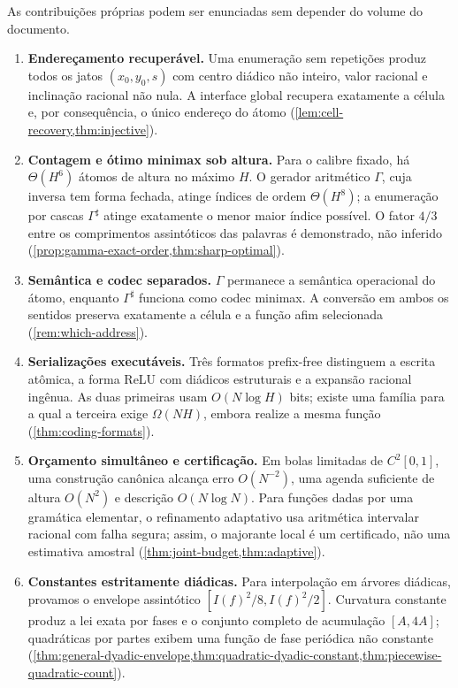 As contribuições próprias podem ser enunciadas sem depender do volume do
documento.

\begin{enumerate}[label=(\roman*),leftmargin=*]
 \item \textbf{Endereçamento recuperável.} Uma enumeração sem repetições
 produz todos os jatos $(x_0,y_0,s)$ com centro diádico não inteiro, valor
 racional e inclinação racional não nula. A interface global recupera
 exatamente a célula e, por consequência, o único endereço do átomo
 (\cref{lem:cell-recovery,thm:injective}).

 \item \textbf{Contagem e ótimo minimax sob altura.} Para o calibre fixado,
 há $\Theta(H^6)$ átomos de altura no máximo $H$. O gerador aritmético
 $\Gamma$, cuja inversa tem forma fechada, atinge índices de ordem
 $\Theta(H^8)$; a enumeração por cascas $\Gamma^\sharp$ atinge exatamente o
 menor maior índice possível. O fator $4/3$ entre os comprimentos assintóticos
 das palavras é demonstrado, não inferido
 (\cref{prop:gamma-exact-order,thm:sharp-optimal}).

 \item \textbf{Semântica e codec separados.} $\Gamma$ permanece a semântica
 operacional do átomo, enquanto $\Gamma^\sharp$ funciona como codec minimax.
 A conversão em ambos os sentidos preserva exatamente a célula e a função
 afim selecionada (\cref{rem:which-address}).

 \item \textbf{Serializações executáveis.} Três formatos prefix-free
 distinguem a escrita atômica, a forma ReLU com diádicos estruturais e a
 expansão racional ingênua. As duas primeiras usam $O(N\log H)$ bits; existe
 uma família para a qual a terceira exige $\Omega(NH)$, embora realize a mesma
 função (\cref{thm:coding-formats}).

 \item \textbf{Orçamento simultâneo e certificação.} Em bolas limitadas de
 $C^2[0,1]$, uma construção canônica alcança erro $O(N^{-2})$, uma agenda
 suficiente de altura $O(N^2)$ e descrição $O(N\log N)$. Para funções dadas por uma gramática
 elementar, o refinamento adaptativo usa aritmética intervalar racional com
 falha segura; assim, o majorante local é um certificado, não uma estimativa
 amostral (\cref{thm:joint-budget,thm:adaptive}).

 \item \textbf{Constantes estritamente diádicas.} Para interpolação em
 árvores diádicas, provamos o envelope assintótico
 $[I(f)^2/8,I(f)^2/2]$. Curvatura constante produz a lei exata por fases e o
 conjunto completo de acumulação $[A,4A]$; quadráticas por partes exibem uma
 função de fase periódica não constante
 (\cref{thm:general-dyadic-envelope,thm:quadratic-dyadic-constant,thm:piecewise-quadratic-count}).


\end{enumerate}
